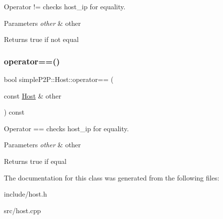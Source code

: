 Operator != checks host\+\_\+ip for equality. 


\begin{DoxyParams}{Parameters}
{\em other} & other \\
\hline
\end{DoxyParams}
\begin{DoxyReturn}{Returns}
true if not equal 
\end{DoxyReturn}
\mbox{\label{classsimpleP2P_1_1Host_aadac09c6ab516f62e5eebe28dd584626}} 
\subsubsection{\texorpdfstring{operator==()}{operator==()}}
{\footnotesize\ttfamily bool simple\+P2\+P\+::\+Host\+::operator== (\begin{DoxyParamCaption}\item[{const \hyperlink{classsimpleP2P_1_1Host}{Host} \&}]{other }\end{DoxyParamCaption}) const}



Operator == checks host\+\_\+ip for equality. 


\begin{DoxyParams}{Parameters}
{\em other} & other \\
\hline
\end{DoxyParams}
\begin{DoxyReturn}{Returns}
true if equal 
\end{DoxyReturn}


The documentation for this class was generated from the following files\+:\begin{DoxyCompactItemize}
\item 
include/host.\+h\item 
src/host.\+cpp\end{DoxyCompactItemize}
